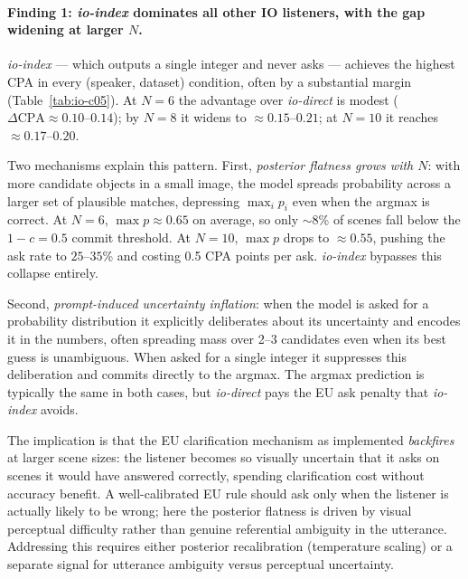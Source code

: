 \documentclass[11pt]{article}
\begin{document}
\paragraph{Finding 1: \textit{io-index} dominates all other IO listeners, with the gap widening at larger $N$.}
\textit{io-index} --- which outputs a single integer and never asks --- achieves
the highest CPA in every (speaker, dataset) condition, often by a substantial
margin (Table~\ref{tab:io-c05}).
At $N{=}6$ the advantage over \textit{io-direct} is modest ($\Delta\text{CPA}
\approx 0.10$--$0.14$); by $N{=}8$ it widens to $\approx 0.15$--$0.21$; at
$N{=}10$ it reaches $\approx 0.17$--$0.20$.

Two mechanisms explain this pattern.
First, \emph{posterior flatness grows with $N$}: with more candidate objects in a
small image, the model spreads probability across a larger set of plausible
matches, depressing $\max_i p_i$ even when the argmax is correct.
At $N{=}6$, $\max p \approx 0.65$ on average, so only $\sim 8$\% of scenes
fall below the $1{-}c = 0.5$ commit threshold.
At $N{=}10$, $\max p$ drops to $\approx 0.55$, pushing the ask rate to
$25$--$35$\% and costing 0.5 CPA points per ask.
\textit{io-index} bypasses this collapse entirely.

Second, \emph{prompt-induced uncertainty inflation}: when the model is asked for a
probability distribution it explicitly deliberates about its uncertainty and
encodes it in the numbers, often spreading mass over 2--3 candidates even when
its best guess is unambiguous.
When asked for a single integer it suppresses this deliberation and commits
directly to the argmax.
The argmax prediction is typically the same in both cases, but \textit{io-direct}
pays the EU ask penalty that \textit{io-index} avoids.

The implication is that the EU clarification mechanism as implemented
\emph{backfires} at larger scene sizes: the listener becomes so visually
uncertain that it asks on scenes it would have answered correctly, spending
clarification cost without accuracy benefit.
A well-calibrated EU rule should ask only when the listener is actually likely
to be wrong; here the posterior flatness is driven by visual perceptual
difficulty rather than genuine referential ambiguity in the utterance.
Addressing this requires either posterior recalibration (temperature scaling) or
a separate signal for utterance ambiguity versus perceptual uncertainty.
\end{document}
